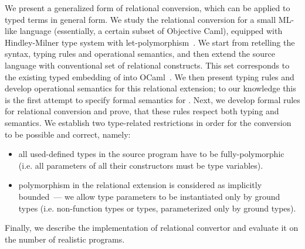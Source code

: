 We present a generalized form of relational conversion, which can be applied to typed terms in general form. We study the relational conversion 
for a small ML-like language (essentially, a certain subset of Objective Caml), equipped with Hindley-Milner type system with let-polymorphism~\cite{Types}. 
We start from retelling the syntax, typing rules and operational semantics, and then extend the source language with conventional set of 
relational constructs. This set corresponds to the existing typed embedding of \miniKanren into OCaml~\cite{ocanren}. We then present typing rules and 
develop operational semantics for this relational extension; to our knowledge this is the first attempt to specify formal semantics for
\miniKanren. Next, we develop formal rules for relational conversion and prove, that these rules respect both typing and
semantics. We establish two type-related restrictions in order for the conversion to be possible and correct, namely:

\begin{itemize}
\item all used-defined types in the source program have to be fully-polymorphic (i.e. all parameters of all their constructors must be type variables).
\item polymorphism in the relational extension is considered as implicitly bounded~--- we allow type parameters to be instantiated only
by ground types (i.e. non-function types or types, parameterized only by ground types).
\end{itemize}

Finally, we describe the implementation of relational convertor and evaluate it on the number of realistic programs.
